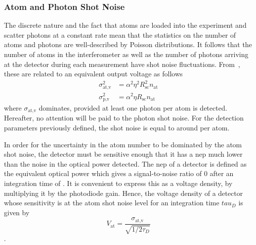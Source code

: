 \subsubsection{Atom and Photon Shot Noise}
The discrete nature and the fact that atoms are loaded into the
experiment and scatter photons at a constant rate mean that the
statistics on the number of atoms and photons are well-described by
Poisson distributions. It follows that the number of atoms in the
interferometer as well as the number of photons arriving at the detector during
each measurement have
shot noise fluctuations. From~, these are related to an
equivalent output voltage as follows
\begin{align}
  \sigma_\text{at,v}^2 &= \alpha^2 \eta^2 R_\text{sc}^2 n_\text{at}\\
  \sigma_\text{p,v}^2 &= \alpha^2 \eta R_\text{sc} n_\text{at} 
  \label{eq:atom_photon_noise}
\end{align}
where \(\sigma_\text{at,v}\) dominates, provided at least one photon
per atom is detected. Hereafter, no attention will be paid to the
photon shot noise. For the detection parameters previously defined,
the shot noise is equal to around  per atom. 
\par\noindent
In order for the uncertainty in the atom number to
be dominated by the atom shot noise, the detector must be sensitive
enough that it has a \ac{nep} much lower than the noise in the optical
power detected. The \ac{nep} of a detector is defined as the
equivalent optical power which gives a signal-to-noise ratio of 0
after an integration time of . It is convenient
to express this as a voltage density, by multiplying it by the
photodiode gain. Hence, the
voltage density of a detector whose sensitivity is at the atom shot noise
level for an integration time \(tau_D\) is given by
\begin{equation}
  V_\text{at} = \frac{\sigma_\text{at,v}}{\sqrt{1/2\tau_D}}
  \label{eq:nep}
\end{equation}. 

